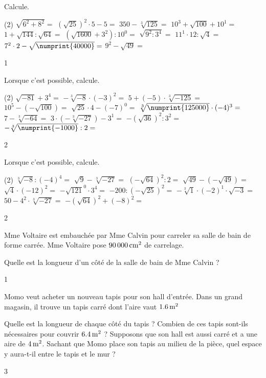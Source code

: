 \documentclass[a4paper,11pt]{report}
\begin{document}
\begin{exop}{%
Calcule.
\begin{tasks}(2)
    \task $\sqrt{6^2+8^2}=$
    \task $(\sqrt{25})^2\cdot5-5=$
    \task $350-\sqrt[3]{125}=$
    \task $10^3+\sqrt{100}+10^1=$
    \task $1+\sqrt{144}:\sqrt{64}=$
    \task $(\sqrt{1600}+3^2):10^0=$
    \task $\sqrt{9^2:3^4}=$
    \task $11^1\cdot12:\sqrt{4}=$
    \task $7^2\cdot2-\sqrt{\numprint{40000}}=$
    \task $9^2-\sqrt{49}=$
\end{tasks}
}{1}    
\end{exop}


\begin{exop}{%
Lorsque c'est possible, calcule.
\begin{tasks}(2)
    \task $\sqrt{-81}+3^4=$
    \task $-\sqrt[3]{-8}\cdot(-3)^2=$
    \task $5+(-5)\cdot\sqrt[3]{-125}=$
    \task $10^5-(-\sqrt{100})=$
    \task $\sqrt{25}\cdot4-(-7)^0=$
    \task $\sqrt[3]{\numprint{125000}}\cdot(-4)^3=$
    \task $7-\sqrt[3]{-64}=$
    \task $3\cdot(-\sqrt[3]{-27})-3^1=$
    \task $-(\sqrt{36})^2:3^2=$
    \task $-\sqrt[3]{\numprint{-1000}}:2=$
\end{tasks}
}{2}    
\end{exop}

\begin{exop}{%
Lorsque c'est possible, calcule.
\begin{tasks}(2)
    \task $\sqrt[3]{-8}:(-4)^4=$
    \task $\sqrt{9}-\sqrt[3]{-27}=$
    \task $(-\sqrt{64})^2:2=$
    \task $\sqrt{49}-(-\sqrt{49})=$
    \task $\sqrt{4}\cdot(-12)^2=$
    \task $-\sqrt{121}^0\cdot3^4=$
    \task $-200:(-\sqrt{25})^2=$
    \task $-\sqrt[3]{1}\cdot(-2)^1\cdot\sqrt{-3}=$
    \task $50-4^2\cdot\sqrt[3]{-27}=$
    \task $-(\sqrt{64})^2+(-8)^2=$
\end{tasks}
}{2}    
\end{exop}











\begin{exo}{
    Mme Voltaire est embauchée par Mme Calvin pour carreler sa salle de bain de forme carrée. Mme Voltaire pose $\tunit{90000}{\centi m^2}$ de carrelage.
    
    Quelle est la longueur d'un côté de la salle de bain de Mme Calvin ?
}{1}    
\end{exo}

\begin{exo}{
    Momo veut acheter un nouveau tapis pour son hall d'entrée. Dans un grand magasin, il trouve un tapis carré dont l'aire vaut $\tunit{1,6}{m^2}$

    \begin{tasks}
        \task Quelle est la longueur de chaque côté du tapis ?
        \task Combien de ces tapis sont-ils nécessaires pour couvrir $\tunit{6,4}{m^2}$ ?
        \task Supposons que son hall est aussi carré et a une aire de $\tunit{4}{m^2}$. Sachant que Momo place son tapis au milieu de la pièce, quel espace y aura-t-il entre le tapis et le mur ?
    \end{tasks}
}{3}    
\end{exo}
\end{document}

